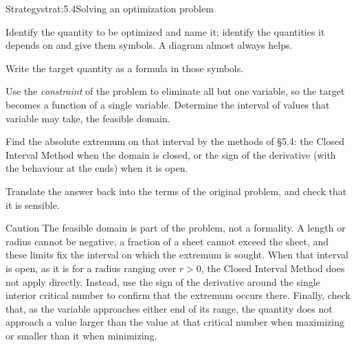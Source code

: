 \documentclass[a4paper,12pt,oneside]{memoir}
\begin{document}
\begin{envstrategy}{Strategy}{strat:5.4}{Solving an optimization problem}
\begin{steps}
  \item Identify the quantity to be optimized and name it; identify the quantities it depends on and give them symbols. A diagram almost always helps.
  \item Write the target quantity as a formula in those symbols.
  \item Use the \emph{constraint} of the problem to eliminate all but one variable, so the target becomes a function of a single variable. Determine the interval of values that variable may take, the feasible domain.
  \item Find the absolute extremum on that interval by the methods of §5.4: the Closed Interval Method when the domain is closed, or the sign of the derivative (with the behaviour at the ends) when it is open.
  \item Translate the answer back into the terms of the original problem, and check that it is sensible.
\end{steps}
\end{envstrategy}
\begin{envcaution}{Caution}{}{}
The feasible domain is part of the problem, not a formality. A length or radius cannot be negative, a fraction of a sheet cannot exceed the sheet, and these limits fix the interval on which the extremum is sought. When that interval is open, as it is for a radius ranging over \(r > 0\), the Closed Interval Method does not apply directly. Instead, use the sign of the derivative around the single interior critical number to confirm that the extremum occurs there. Finally, check that, as the variable approaches either end of its range, the quantity does not approach a value larger than the value at that critical number when maximizing or smaller than it when minimizing.
\end{envcaution}
\end{document}
